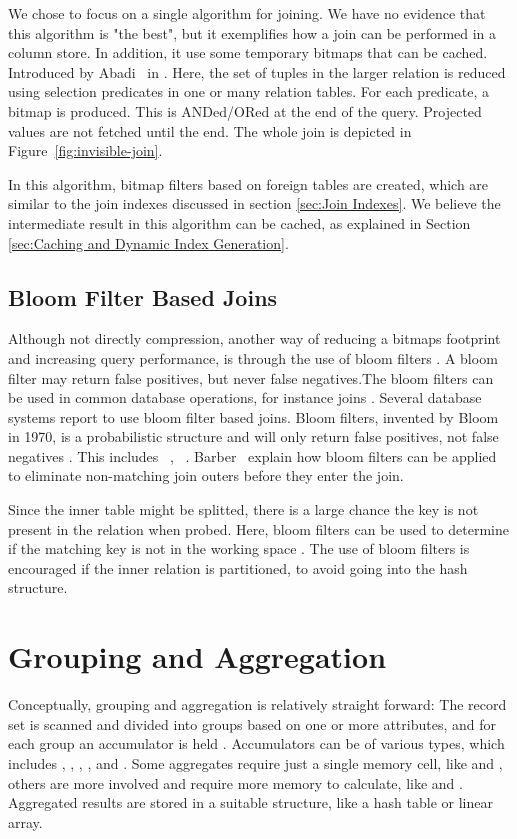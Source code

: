 We chose to focus on a single algorithm for joining. We have no evidence that this algorithm is "the best", but it exemplifies how a join can be performed in a column store. In addition, it use some temporary bitmaps that can be cached. Introduced by Abadi \ea~in  \cite{Abadi2008-dd}. Here, the set of tuples in the larger relation is reduced using selection predicates in one or many relation tables. For each predicate, a bitmap is produced. This is ANDed/ORed at the end of the query. Projected values are not fetched until the end. The whole join is depicted in Figure~\ref{fig:invisible-join}.

In this algorithm, bitmap filters based on foreign tables are created, which are similar to the join indexes discussed in section \ref{sec:Join Indexes}. We believe the intermediate result in this algorithm can be cached, as explained in Section \ref{sec:Caching and Dynamic Index Generation}.

\subsection{Bloom Filter Based Joins}
\label{sub:Bloom Filter Based Joins}
Although not directly compression, another way of reducing a bitmaps footprint and increasing query performance, is through the use of bloom filters \cite{Bloom1970-nr}. A bloom filter may return false positives, but never false negatives.The bloom filters can be used in common database operations, for instance joins \cite{x} . Several database systems report to use bloom filter based joins. Bloom filters, invented by Bloom in 1970, is a probabilistic structure and will only return false positives, not false negatives \cite{Bloom1970-nr}. This includes \oracle~\cite{Lahiri2015-mz}, \ibm~\cite{Raman2013-em}. Barber \ea~explain how bloom filters can be applied to eliminate non-matching join outers before they enter the join.

Since the inner table might be splitted, there is a large chance the key is not present in the relation when probed. Here, bloom filters can be used to determine if the matching key is not in the working space \cite{Bratbergsengen2015}. The use of bloom filters is encouraged if the inner relation is partitioned, to avoid going into the hash structure.

\section{Grouping and Aggregation}
\label{sec:Grouping and Aggregation}
Conceptually, grouping and aggregation is relatively straight forward: The record set is scanned and divided into groups based on one or more attributes, and for each group an accumulator is held \cite{Bratbergsengen2015-ed}. Accumulators can be of various types, which includes , , , , and . Some aggregates require just a single memory cell, like  and , others are more involved and require more memory to calculate, like  and . Aggregated results are stored in a suitable structure, like a hash table or linear array. 

